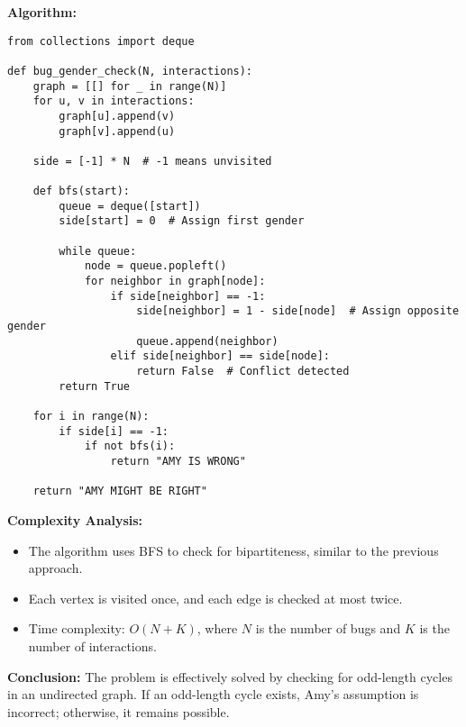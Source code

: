 \documentclass[12pt]{article}
\begin{document}
\textbf{Algorithm:}
\begin{lstlisting}
from collections import deque

def bug_gender_check(N, interactions):
    graph = [[] for _ in range(N)]
    for u, v in interactions:
        graph[u].append(v)
        graph[v].append(u)
    
    side = [-1] * N  # -1 means unvisited

    def bfs(start):
        queue = deque([start])
        side[start] = 0  # Assign first gender
        
        while queue:
            node = queue.popleft()
            for neighbor in graph[node]:
                if side[neighbor] == -1:
                    side[neighbor] = 1 - side[node]  # Assign opposite gender
                    queue.append(neighbor)
                elif side[neighbor] == side[node]:
                    return False  # Conflict detected
        return True

    for i in range(N):
        if side[i] == -1:
            if not bfs(i):
                return "AMY IS WRONG"
    
    return "AMY MIGHT BE RIGHT"
\end{lstlisting}

\textbf{Complexity Analysis:}
\begin{itemize}
    \item The algorithm uses BFS to check for bipartiteness, similar to the previous approach.
    \item Each vertex is visited once, and each edge is checked at most twice.
    \item Time complexity: \(O(N + K)\), where \(N\) is the number of bugs and \(K\) is the number of interactions.
\end{itemize}

\textbf{Conclusion:}  
The problem is effectively solved by checking for odd-length cycles in an undirected graph. If an odd-length cycle exists, Amy's assumption is incorrect; otherwise, it remains possible.
\end{document}
